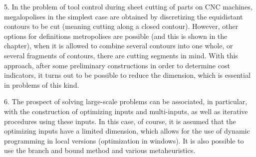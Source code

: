 5. In the problem of tool control during sheet cutting of parts on CNC machines, megalopolises in the simplest case are obtained by discretizing the equidistant contours to be cut (meaning cutting along a closed contour). However, other options for definitions metropolises are possible (and this is shown in the chapter), when it is allowed to combine several contours into one whole, or several fragments of contours, there are cutting segments in mind. With this approach, after some preliminary constructions in order to determine cost indicators, it turns out to be possible to reduce the dimension, which is essential in problems of this kind.

6. The prospect of solving large-scale problems can be associated, in particular, with the construction of optimizing inputs and multi-inputs, as well as iterative procedures using these inputs. In this case, of course, it is assumed that the optimizing inputs have a limited dimension, which allows for the use of dynamic programming in local versions (optimization in windows). It is also possible to use the branch and bound method and various metaheuristics.



% 





